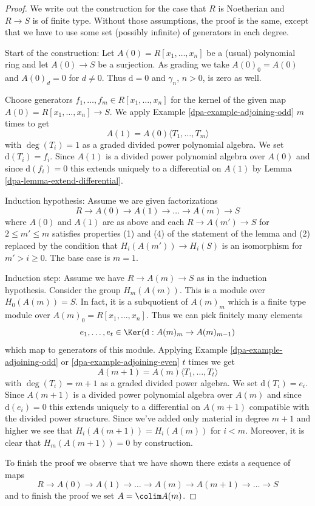 \begin{proof}

We write out the construction for the case that $R$ is Noetherian
and $R\to S$ is of finite type. Without those assumptions, the proof
is the same, except that we have to use some set (possibly
infinite) of generators in each degree.

\medskip\noindent
Start of the construction: Let $A(0) = R[x_1, \ldots, x_n]$ be
a (usual) polynomial ring and let $A(0) \to S$ be a surjection.
As grading we take $A(0)_0 = A(0)$ and $A(0)_d = 0$ for $d \not = 0$.
Thus $\text{d} = 0$ and $\gamma_n$, $n > 0$, is zero as well.

\medskip\noindent
Choose generators $f_1, \ldots, f_m \in R[x_1, \ldots, x_n]$
for the kernel of the given map $A(0) = R[x_1, \ldots, x_n] \to S$.
We apply Example \ref{dpa-example-adjoining-odd} $m$ times to get
$$
A(1) = A(0)\langle T_1, \ldots, T_m\rangle
$$
with $\deg(T_i) = 1$ as a graded divided power polynomial algebra.
We set $\text{d}(T_i) = f_i$. Since $A(1)$ is a divided power polynomial
algebra over $A(0)$ and since $\text{d}(f_i) = 0$
this extends uniquely to a differential on $A(1)$ by
Lemma \ref{dpa-lemma-extend-differential}.

\medskip\noindent
Induction hypothesis: Assume we are given factorizations
$$
R \to A(0) \to A(1) \to \ldots \to A(m) \to S
$$
where $A(0)$ and $A(1)$ are as above and each $R \to A(m') \to S$
for $2 \leq m' \leq m$ satisfies properties (1) and (4)
of the statement of the lemma and (2) replaced by the condition that
$H_i(A(m')) \to H_i(S)$ is an isomorphism for
$m' > i \geq 0$. The base case is $m = 1$.

\medskip\noindent
Induction step: Assume we have $R \to A(m) \to S$
as in the induction hypothesis. Consider the
group $H_m(A(m))$. This is a module over $H_0(A(m)) = S$.
In fact, it is a subquotient of $A(m)_m$ which is a finite
type module over $A(m)_0 = R[x_1, \ldots, x_n]$.
Thus we can pick finitely many elements
$$
e_1, \ldots, e_t \in \Ker(\text{d} : A(m)_m \to A(m)_{m - 1})
$$
which map to generators of this module. Applying
Example \ref{dpa-example-adjoining-odd} or
\ref{dpa-example-adjoining-even} $t$ times we get
$$
A(m + 1) = A(m)\langle T_1, \ldots, T_t\rangle
$$
with $\deg(T_i) = m + 1$ as a graded divided power algebra. We set
$\text{d}(T_i) = e_i$. Since $A(m+1)$ is a divided power polynomial
algebra over $A(m)$ and since $\text{d}(e_i) = 0$
this extends uniquely to a differential on $A(m + 1)$
compatible with the divided power structure.
Since we've added only material in degree $m + 1$ and higher we see
that $H_i(A(m + 1)) = H_i(A(m))$ for $i < m$. Moreover, it is
clear that $H_m(A(m + 1)) = 0$ by construction.

\medskip\noindent
To finish the proof we observe that we have shown there exists
a sequence of maps
$$
R \to A(0) \to A(1) \to \ldots \to A(m) \to A(m + 1) \to \ldots \to S
$$
and to finish the proof we set $A = \colim A(m)$.
\end{proof}

